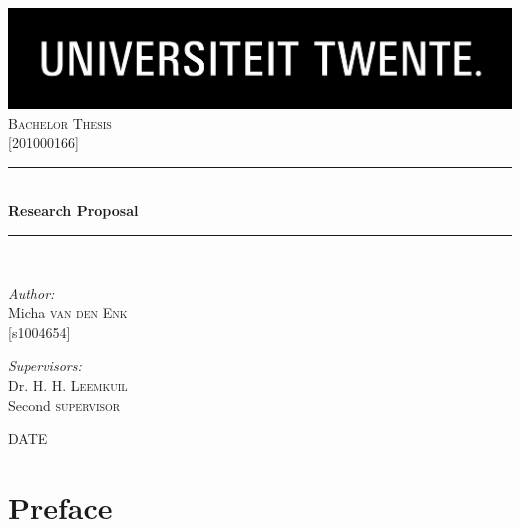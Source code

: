\documentclass[12pt]{report} %
\newcommand{\HRule}{\rule{\linewidth}{0.5mm}}
\begin{document}
\begin{titlepage}

\begin{center}


\includegraphics[width=1\textwidth]{./logo}\\[1cm]    

\textsc{\Large Bachelor Thesis}\\[0.5cm]
\textsc{\Large {[}201000166{]}}\\[0.5cm]


\HRule \\[0.4cm]
{ \huge \bfseries Research Proposal}\\[0.4cm]

\HRule \\[1.5cm]

\begin{minipage}{0.4\textwidth}
\begin{flushleft} \large
\emph{Author:}\\
Micha \textsc{van den Enk} \\
{[}s1004654{]} \\
\end{flushleft}
\end{minipage}
\begin{minipage}{0.4\textwidth}
\begin{flushright} \large
\emph{Supervisors:} \\
Dr. H. H. \textsc{Leemkuil} \\
Second \textsc{supervisor} \\
\end{flushright}
\end{minipage}

\vfill

{\large DATE}

\end{center}

\end{titlepage}

\tableofcontents

\chapter{Preface}
\end{document}
